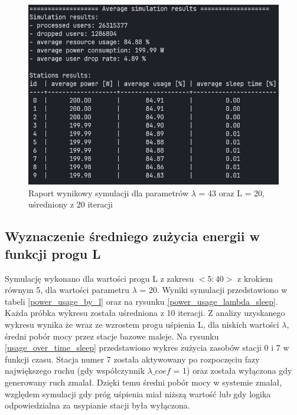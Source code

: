\begin{figure}[h!]
\center
\includegraphics[scale=0.6]{img/sim_results_sleep_lambda_43.png} 
\caption{Raport wynikowy symulacji dla parametrów $\lambda$ = 43 oraz L = 20, uśredniony z 20 iteracji}
\label{sim_results_average}
\end{figure}

\newpage
\subsection{Wyznaczenie średniego zużycia energii w funkcji progu L} \label{power_l_plot}
Symulację wykonano dla wartości progu L z zakresu $<5:40>$ z krokiem równym 5, dla wartości parametru $\lambda$ = 20. Wyniki symulacji przedstawiono w tabeli \ref{power_usage_by_l} oraz na rysunku \ref{power_usage_lambda_sleep}. Każda próbka wykresu została uśredniona z 10 iteracji. Z analizy uzyskanego wykresu wynika że wraz ze wzrostem progu uśpienia L, dla niskich wartości $\lambda$, średni pobór mocy przez stacje bazowe maleje. Na rysunku \ref{usage_over_time_sleep} przedstawiono wykres zużycia zasobów stacji 0 i 7 w funkcji czasu. Stacja numer 7 została aktywowany po rozpoczęciu fazy największego ruchu (gdy współczynnik $\lambda\_coef$ = 1) oraz została wyłączona gdy generowany ruch zmalał. Dzięki temu średni pobór mocy w systemie zmalał, względem symulacji gdy próg uśpienia miał niższą wartość lub gdy logika odpowiedzialna za usypianie stacji była wyłączona.

